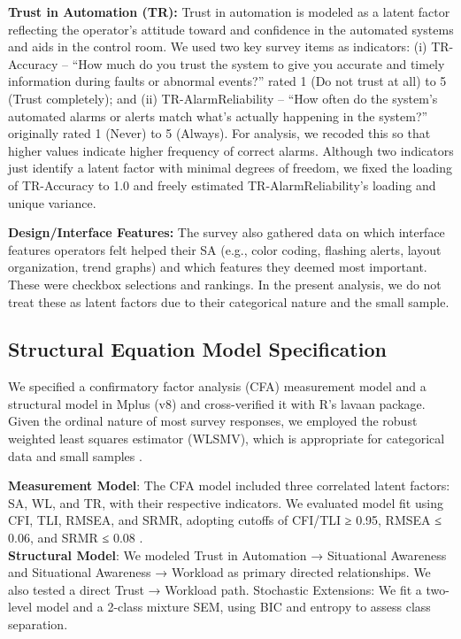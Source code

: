 \documentclass[conference]{IEEEtran}
\begin{document}
\textbf{Trust in Automation (TR):} Trust in automation is modeled as a latent factor reflecting the operator’s attitude toward and confidence in the automated systems and aids in the control room. We used two key survey items as indicators: (i) TR-Accuracy – “How much do you trust the system to give you accurate and timely information during faults or abnormal events?” rated 1 (Do not trust at all) to 5 (Trust completely); and (ii) TR-AlarmReliability – “How often do the system’s automated alarms or alerts match what’s actually happening in the system?” originally rated 1 (Never) to 5 (Always). For analysis, we recoded this so that higher values indicate higher frequency of correct alarms. Although two indicators just identify a latent factor with minimal degrees of freedom, we fixed the loading of TR-Accuracy to 1.0 and freely estimated TR-AlarmReliability’s loading and unique variance.

\textbf{Design/Interface Features:} The survey also gathered data on which interface features operators felt helped their SA (e.g., color coding, flashing alerts, layout organization, trend graphs) and which features they deemed most important. These were checkbox selections and rankings. In the present analysis, we do not treat these as latent factors due to their categorical nature and the small sample.

\subsection{Structural Equation Model Specification}
We specified a confirmatory factor analysis (CFA) measurement model and a structural model in Mplus (v8) and cross-verified it with R’s lavaan package. Given the ordinal nature of most survey responses, we employed the robust weighted least squares estimator (WLSMV), which is appropriate for categorical data and small samples \cite{taylor1999cutoff}. 

\textbf{Measurement Model}: The CFA model included three correlated latent factors: SA, WL, and TR, with their respective indicators. We evaluated model fit using CFI, TLI, RMSEA, and SRMR, adopting cutoffs of CFI/TLI ≥ 0.95, RMSEA ≤ 0.06, and SRMR ≤ 0.08 \cite{taylor1999cutoff}.\\

\textbf{}
\textbf{Structural Model}: We modeled Trust in Automation → Situational Awareness and Situational Awareness → Workload as primary directed relationships. We also tested a direct Trust → Workload path. Stochastic Extensions: We fit a two-level model and a 2-class mixture SEM, using BIC and entropy to assess class separation.
\end{document}
